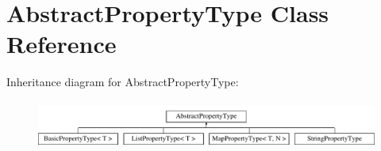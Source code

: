 \hypertarget{classAbstractPropertyType}{\section{Abstract\-Property\-Type Class Reference}
\label{classAbstractPropertyType}
}
Inheritance diagram for Abstract\-Property\-Type\-:\begin{figure}[H]
\begin{center}
\leavevmode
\includegraphics[height=1.637427cm]{classAbstractPropertyType}
\end{center}
\end{figure}
